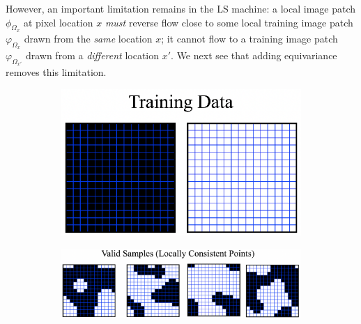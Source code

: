 \documentclass{article}
\theoremstyle{plain}
\theoremstyle{definition}
\theoremstyle{remark}
\begin{document}
However, an important limitation remains in the LS machine: a local image patch $\phi_{\Omega_x}$ at pixel location $x$ {\it must} reverse flow close to some local training image patch $\varphi_{\Omega_x}$ drawn from the {\it same} location $x$; it cannot flow to a training image patch $\varphi_{\Omega_{x'}}$ drawn from a {\it different} location $x'$.  We next see that adding equivariance removes this limitation. 

\begin{figure}[t]
    \centering
    
    \begin{subfigure}[b]{0.2\linewidth}
    \includegraphics[width=\linewidth,valign=b]{wf1.png}
    \label{fig:exceptional_pointsa}
    \vspace{-1em}
    \caption{}
    \end{subfigure}\hspace{8mm} 
    \begin{subfigure}[b]{0.42\linewidth}
    \includegraphics[width=\linewidth,valign=b]{wf2.png}
    \label{fig:exceptional_pointsb}
    \vspace{-1em}
    \caption{}
    \end{subfigure}\hspace{8mm} 
    \begin{subfigure}[b]{0.2\linewidth}

\end{subfigure}
\end{figure}
\end{document}
